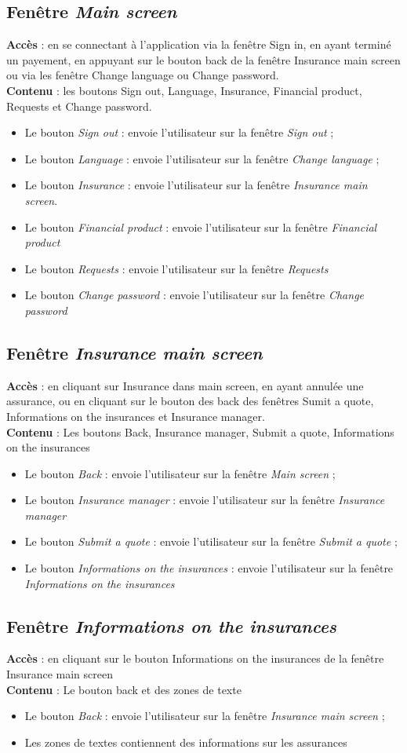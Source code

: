 \documentclass{article}
\newcommand{\navbutton}[2]{Le bouton \emph{#1} : envoie l'utilisateur sur la fenêtre \emph{#2}}
\newcommand{\access}[1]{ \noindent\textbf{Accès} : #1 \\}
\newcommand{\content}[1]{\textbf{Contenu} : #1}
\begin{document}
\subsection{Fenêtre \emph{Main screen}}
\access{en se connectant à l'application via la fenêtre Sign in, en ayant terminé un payement, en appuyant sur le bouton back de la fenêtre Insurance main screen ou via les fenêtre Change language ou Change password.}
\content{les boutons Sign out, Language, Insurance, Financial product, Requests et Change password.}
\begin{itemize}
\item \navbutton{Sign out}{Sign out} ;
\item \navbutton{Language}{Change language} ;
\item \navbutton{Insurance}{Insurance main screen}.
\item \navbutton{Financial product}{Financial product}
\item \navbutton{Requests}{Requests}
\item \navbutton{Change password}{Change password}
\end{itemize}


\subsection{Fenêtre \emph{Insurance main screen}}
\access{en cliquant sur Insurance dans main screen, en ayant annulée une assurance, ou en cliquant sur le bouton des back des fenêtres Sumit a quote, Informations on the insurances et Insurance manager.}
\content{Les boutons Back, Insurance manager, Submit a quote, Informations on the insurances}
\begin{itemize}
\item \navbutton{Back}{Main screen} ;
\item \navbutton{Insurance manager}{Insurance manager}
\item \navbutton{Submit a quote}{Submit a quote} ;
\item \navbutton{Informations on the insurances}{Informations on the insurances}
\end{itemize}


\subsection{Fenêtre \emph{Informations on the insurances}}
\access{en cliquant sur le bouton Informations on the insurances de la fenêtre Insurance main screen}
\content{Le bouton back et des zones de texte}
\begin{itemize}
\item \navbutton{Back}{Insurance main screen} ;
\item Les zones de textes contiennent des informations sur les assurances
\end{itemize}
\end{document}
